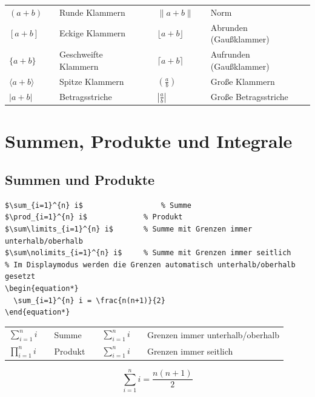 \documentclass[12pt,a4paper]{article}
\begin{document}
\begin{ausgabe}
\begin{tabular}{l c l c l c l}
	$(a+b)$ & & Runde Klammern & & $\|a+b\|$ & & Norm\\
	$[a+b]$ & & Eckige Klammern & & $\lfloor a+b \rfloor$ & & Abrunden (Gaußklammer)\\
	$\{a+b\}$ & & Geschweifte Klammern & & $\lceil a+b \rceil$ & & Aufrunden (Gaußklammer)\\
	$\langle a+b \rangle$ & & Spitze Klammern & & $\left( \frac{a}{b} \right)$ & & Große Klammern\\
	$|a+b|$ & & Betragsstriche & & $\left\lvert \frac{a}{b} \right\rvert$ & & Große Betragsstriche
\end{tabular}
\end{ausgabe}



\section{Summen, Produkte und Integrale}



\subsection{Summen und Produkte}

\begin{lstlisting}[style=latex]
$\sum_{i=1}^{n} i$           		% Summe
$\prod_{i=1}^{n} i$           	% Produkt
$\sum\limits_{i=1}^{n} i$     	% Summe mit Grenzen immer unterhalb/oberhalb
$\sum\nolimits_{i=1}^{n} i$   	% Summe mit Grenzen immer seitlich
% Im Displaymodus werden die Grenzen automatisch unterhalb/oberhalb gesetzt
\begin{equation*}
  \sum_{i=1}^{n} i = \frac{n(n+1)}{2}
\end{equation*}
\end{lstlisting}

\begin{ausgabe}
\begin{tabular}{l c l c l c l}
$\sum_{i=1}^{n} i$ & & Summe & \hspace{1cm } & $\sum\limits_{i=1}^{n} i$ & & Grenzen immer unterhalb/oberhalb\\
$\prod_{i=1}^{n} i$ & &  Produkt & & $\sum\nolimits_{i=1}^{n} i$ & & Grenzen immer seitlich
\end{tabular}
\begin{equation*}
  \sum_{i=1}^{n} i = \frac{n(n+1)}{2}
\end{equation*}
\end{ausgabe}
\end{document}
